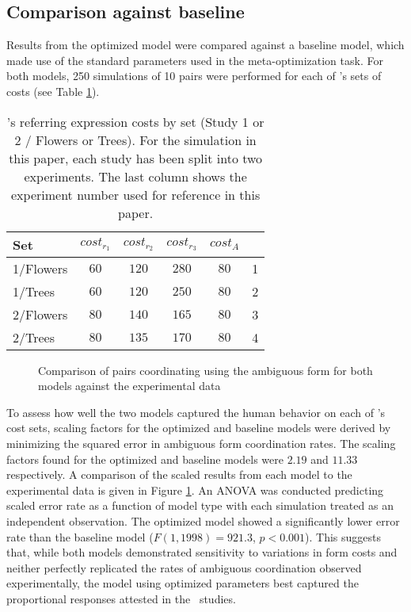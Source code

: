 \documentclass[a4paper,11pt]{article}
\begin{document}
\subsection{Comparison against baseline}
\label{sec:model_comparison}
Results from the optimized model were compared against a baseline model, which made use of the standard parameters used in the meta-optimization task. For both models, 250 simulations of 10 pairs were performed for each of \citeauthor{rohde2012}'s sets of costs (see Table \ref{table:2}).
\begin{table}[]
\begin{center}
    \begin{tabular}{l c c c c | c}
    Set & $cost_{r_1}$ & $cost_{r_2}$ & $cost_{r_3}$ & $cost_A$ & \\ \hline
    1/Flowers & $60$ & $120$ & $280$ & $80$ & 1\\ \hline
    1/Trees & $60$ & $120$ & $250$ & $80$ & 2\\ \hline
    2/Flowers & $80$ & $140$ & $165$ & $80$ & 3\\ \hline
    2/Trees & $80$ & $135$ & $170$ & $80$ & 4\\ 
    \end{tabular}
    \caption{\citeauthor{rohde2012}'s referring expression costs by set (Study 1 or 2 / Flowers or Trees). For the simulation in this paper, each study has  been split into two experiments. The last column shows the experiment number used for reference in this paper.}
    \label{table:2}
\end{center}
\end{table}

\begin{figure}[t]
\centering
\scalebox{.55}{}
\caption{Comparison of pairs coordinating using the ambiguous form for both models against the experimental data}
\label{fig:model_comp}
\end{figure}

To assess how well the two models captured the human behavior on each of \citeauthor{rohde2012}'s cost sets, scaling factors for the optimized and baseline models were derived by minimizing the squared error in ambiguous form coordination rates. The scaling factors found for the optimized and baseline models were $2.19$ and $11.33$ respectively. A comparison of the scaled results from each model to the experimental data is given in Figure \ref{fig:model_comp}. An ANOVA was conducted predicting scaled error rate as a function of model type with each simulation treated as an independent observation. The optimized model showed a significantly lower error rate than the baseline model ($F(1, 1998) = 921.3$, $p<0.001$). This suggests that, while both models demonstrated sensitivity to variations in form costs and neither perfectly replicated the rates of ambiguous coordination observed experimentally, the model using optimized parameters best captured the proportional responses attested in the \citeauthor{rohde2012}\ studies. 
\end{document}
